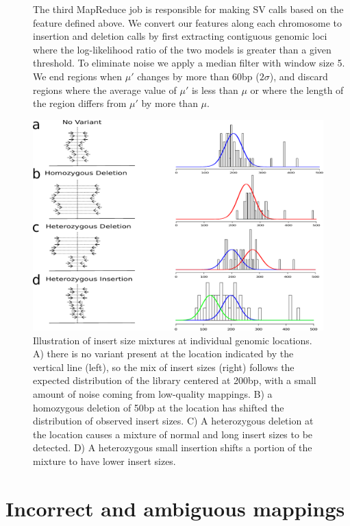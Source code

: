 \begin{description}
\item[] The third MapReduce job is responsible for making SV calls based on the feature defined above. We convert our features along each chromosome to insertion and deletion calls by first extracting contiguous genomic loci where the log-likelihood ratio of the two models is greater than a given threshold. To eliminate noise we apply a median filter with window size 5. We end regions when $\mu'$ changes by more than 60bp ($2\sigma$), and discard regions where the average value of $\mu'$ is less than $\mu$ or where the length of the region differs from $\mu'$ by more than $\mu$.
\end{description}



\begin{figure}
\centering
\includegraphics[width=.9\textwidth]{figures/insert_size_mixtures.pdf}
\caption{Illustration of insert size mixtures at individual genomic locations. A) there is no variant present at the location indicated by the vertical line (left), so the mix of insert sizes (right) follows the expected distribution of the library centered at 200bp, with a small amount of noise coming from low-quality mappings. B) a homozygous deletion of 50bp at the location has shifted the distribution of observed insert sizes. C) A heterozygous deletion at the location causes a mixture of normal and long insert sizes to be detected. D) A heterozygous small insertion shifts a portion of the mixture to have lower insert sizes.}
\label{insert_size_mixes}
\end{figure}


\section{Incorrect and ambiguous mappings}

